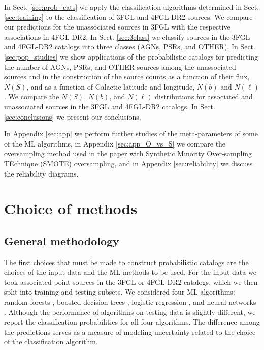 \documentclass[referee]{aa} %
\newcommand{\lb}{\label}
\begin{document}
In Sect. \ref{sec:prob_cats} we apply the classification algorithms determined in Sect. \ref{sec:training} to the classification of 3FGL and 4FGL-DR2 sources.
We compare our predictions for the unassociated sources in 3FGL with the respective associations in 4FGL-DR2.
In Sect. \ref{sec:3class} we classify sources in the 3FGL and 4FGL-DR2 catalogs into three classes (AGNs, PSRs, and OTHER).
In Sect. \ref{sec:pop_studies} we show applications of the probabilistic catalogs for predicting the number of AGNs, PSRs, and OTHER sources among the unassociated sources and in the construction of the source counts as a function of their flux, $N(S)$, and as a function of 
Galactic latitude and longitude, $N(b)$ and $N(\ell)$.
We compare the $N(S)$, $N(b)$, and $N(\ell)$ distributions for associated and unassociated sources in the 3FGL and 4FGL-DR2 catalogs.
In Sect. \ref{sec:conclusions} we present our conclusions.

In Appendix \ref{sec:app} we perform further studies of the meta-parameters of some of the ML algorithms, 
in Appendix \ref{sec:app_O_vs_S} we compare the oversampling method used in the paper with Synthetic Minority Over-sampling TEchnique (SMOTE)%
oversampling,
and in Appendix \ref{sec:reliability} we discuss the reliability diagrams.


\section{Choice of methods}
\lb{sec:methods}


\subsection{General methodology}


The first choices that must be made to construct probabilistic catalogs are the choices of the input data and the ML methods to be used.
For the input data we took associated point sources in the 3FGL or 4FGL-DR2 catalogs, which we then split into training and testing subsets.
We considered four ML algorithms: random forests \citep[RF;][]{709601, Breiman:2001hzm}, 
boosted decision trees \citep[BDT;][]{friedman2001},  
logistic regression \citep[LR;][]{cox1958}, 
and neural networks \citep[NN;][]{Hopfield:1982pe}.
Although the performance of algorithms on testing data is slightly different, 
we report the classification probabilities for all four algorithms.
The difference among the predictions serves as a measure of modeling uncertainty related 
to the choice of the classification algorithm.
\end{document}
